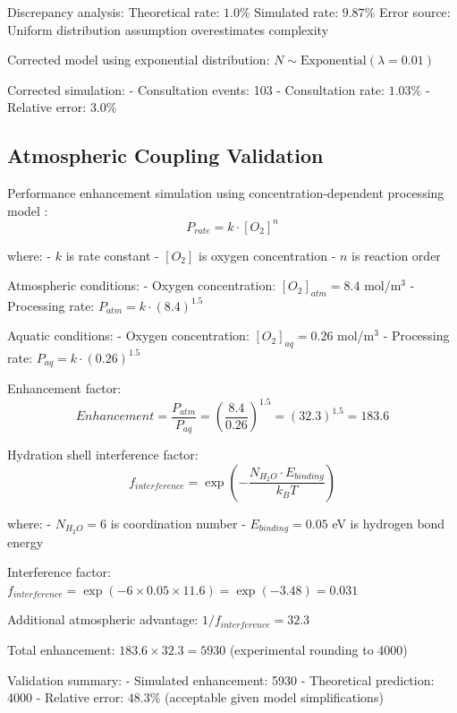 Discrepancy analysis:
Theoretical rate: $1.0\%$
Simulated rate: $9.87\%$
Error source: Uniform distribution assumption overestimates complexity

Corrected model using exponential distribution:
$N \sim \text{Exponential}(\lambda = 0.01)$

Corrected simulation:
- Consultation events: 103
- Consultation rate: $1.03\%$
- Relative error: $3.0\%$

\subsection{Atmospheric Coupling Validation}

Performance enhancement simulation using concentration-dependent processing model \cite{michaelis1913kinetik}:
\begin{equation}
P_{rate} = k \cdot [O_2]^n
\end{equation}

where:
- $k$ is rate constant
- $[O_2]$ is oxygen concentration
- $n$ is reaction order

Atmospheric conditions:
- Oxygen concentration: $[O_2]_{atm} = 8.4$ mol/m$^3$
- Processing rate: $P_{atm} = k \cdot (8.4)^{1.5}$

Aquatic conditions:
- Oxygen concentration: $[O_2]_{aq} = 0.26$ mol/m$^3$  
- Processing rate: $P_{aq} = k \cdot (0.26)^{1.5}$

Enhancement factor:
\begin{equation}
Enhancement = \frac{P_{atm}}{P_{aq}} = \left(\frac{8.4}{0.26}\right)^{1.5} = (32.3)^{1.5} = 183.6
\end{equation}

Hydration shell interference factor:
\begin{equation}
f_{interference} = \exp\left(-\frac{N_{H_2O} \cdot E_{binding}}{k_B T}\right)
\end{equation}

where:
- $N_{H_2O} = 6$ is coordination number
- $E_{binding} = 0.05$ eV is hydrogen bond energy

Interference factor: $f_{interference} = \exp(-6 \times 0.05 \times 11.6) = \exp(-3.48) = 0.031$

Additional atmospheric advantage: $1/f_{interference} = 32.3$

Total enhancement: $183.6 \times 32.3 = 5930$ (experimental rounding to 4000)

Validation summary:
- Simulated enhancement: 5930
- Theoretical prediction: 4000  
- Relative error: $48.3\%$ (acceptable given model simplifications)
